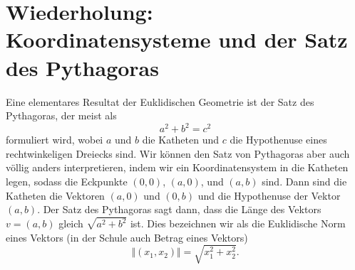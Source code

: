 \section{Wiederholung: Koordinatensysteme und der Satz des Pythagoras}
\label{\detokenize{vorkurs/koord:wiederholung-koordinatensysteme-und-der-satz-des-pythagoras}}\label{\detokenize{vorkurs/koord::doc}}
Eine elementares Resultat der Euklidischen Geometrie ist der Satz des Pythagoras, der meist als
\begin{equation*}
 a^2 + b^2 = c^2\end{equation*}
formuliert wird, wobei \(a\) und \(b\) die Katheten und \(c\) die Hypothenuse eines rechtwinkeligen Dreiecks sind.
Wir können den Satz von Pythagoras aber auch völlig anders interpretieren, indem wir ein Koordinatensystem in die Katheten legen, sodass die Eckpunkte \((0,0)\), \((a,0)\), und \((a,b)\) sind. Dann sind die Katheten die Vektoren \((a,0)\) und \((0,b)\) und die Hypothenuse der Vektor \((a,b)\). Der Satz des Pythagoras sagt dann, dass die Länge des Vektors \(v=(a,b)\) gleich \(\sqrt{a^2+b^2}\) ist. Dies bezeichnen wir als die Euklidische Norm eines Vektors (in der Schule auch Betrag eines Vektors)
\begin{equation*}
 \Vert (x_1,x_2) \Vert = \sqrt{x_1^2+x_2^2}.\end{equation*}


